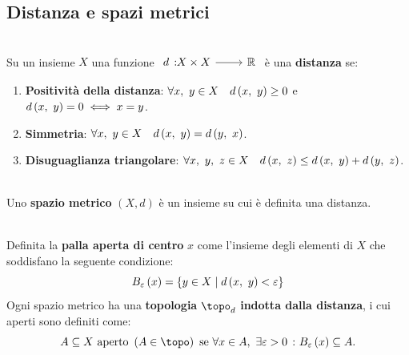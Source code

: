 \subsection{Distanza e spazi metrici}
\begin{define}[Distanza.]~{}\\
	Su un insieme $X$ una funzione $\funz{d}{X\times X}{\realset}$ è una \textbf{distanza} se:
	\begin{enumerate}
		\item \textbf{Positività della distanza}: $\forall x,\ y\in X\quad d\left(x,\ y\right)\geq 0$ e $d\left(x,\ y\right)=0\iff x=y$.
		\item \textbf{Simmetria}: $\forall x,\ y\in X\quad d\left(x,\ y\right)=d\left(y,\ x\right)$.
		\item \textbf{Disuguaglianza triangolare}: $\forall x,\ y,\ z\in X\quad d\left(x,\ z\right)\leq d\left(x,\ y\right)+d\left(y,\ z\right)$.
	\end{enumerate}
\vspace{-3mm}
\end{define}
\begin{define}~{}\\
	Uno \textbf{spazio metrico} $\left(X, d\right)$ è un insieme su cui è definita una distanza.
\end{define}
\begin{define}~{}\\
	Definita la \textbf{palla aperta di centro} $x$ come l'insieme degli elementi di $X$ che soddisfano la seguente condizione:
	\begin{equation}
		B_{\varepsilon}\left(x\right)=\left\{y\in X\mid d\left(x,\ y\right)<\varepsilon\right\}
	\end{equation}
	Ogni spazio metrico ha una \textbf{topologia} $\topo_d$ \textbf{indotta dalla distanza}, i cui aperti sono definiti come:
	\begin{equation}
		A\subseteq X \text{ aperto } \left(A\in\topo\right) \text{ se } \forall x\in A,\ \exists \epsilon>0\ \colon B_{\epsilon}\left(x\right)\subseteq A.
	\end{equation}
\vspace{-6mm}
\end{define}
